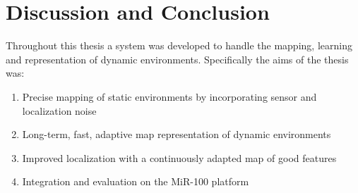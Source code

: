 \chapter{Discussion and Conclusion}

Throughout this thesis a system was developed to handle the mapping, learning and representation of dynamic environments.
Specifically the aims of the thesis was:
\begin{enumerate}
	\item Precise mapping of static environments by incorporating sensor and localization noise
	\item Long-term, fast, adaptive map representation of dynamic environments
	\item Improved localization with a continuously adapted map of good features
	\item Integration and evaluation on the MiR-100 platform
\end{enumerate}




